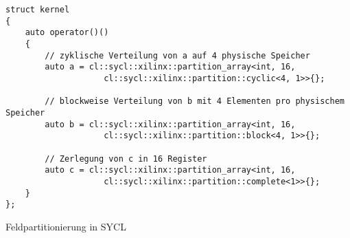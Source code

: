 \begin{code}
    \begin{verbatim}
struct kernel
{
    auto operator()()
    {
        // zyklische Verteilung von a auf 4 physische Speicher
        auto a = cl::sycl::xilinx::partition_array<int, 16,
                    cl::sycl::xilinx::partition::cyclic<4, 1>>{};

        // blockweise Verteilung von b mit 4 Elementen pro physischem Speicher
        auto b = cl::sycl::xilinx::partition_array<int, 16,
                    cl::sycl::xilinx::partition::block<4, 1>>{};

        // Zerlegung von c in 16 Register
        auto c = cl::sycl::xilinx::partition_array<int, 16,
                    cl::sycl::xilinx::partition::complete<1>>{};
    }
};
    \end{verbatim}
    \caption{Feldpartitionierung in SYCL}
    \label{sycl:erweiterungen:xilinx:partitioning:sycl}
\end{code}
